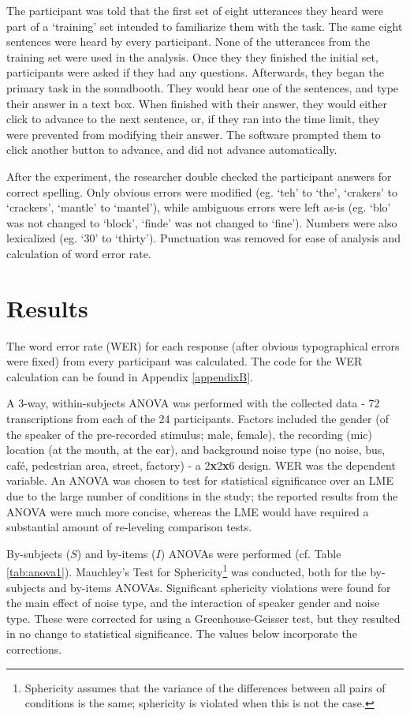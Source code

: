 The participant was told that the first set of eight utterances they heard were part of a `training' set intended to familiarize them with the task. The same eight sentences were heard by every participant.  None of the utterances from the training set were used in the analysis.  Once they they finished the initial set, participants were asked if they had any questions.  Afterwards, they began the primary task in the soundbooth.  They would hear one of the sentences, and type their answer in a text box.  When finished with their answer, they would either click to advance to the next sentence, or, if they ran into the time limit, they were prevented from modifying their answer.  The software prompted them to click another button to advance, and did not advance automatically.

After the experiment, the researcher double checked the participant answers for correct spelling.  Only obvious errors were modified (eg. `teh' to `the', `crakers' to `crackers', `mantle' to `mantel'), while ambiguous errors were left as-is (eg. `blo' was not changed to `block', `finde' was not changed to `fine').  Numbers were also lexicalized (eg. `30' to `thirty').  Punctuation was removed for ease of analysis and calculation of word error rate.


\section{Results}
\label{chap3:results}



The word error rate (WER) for each response (after obvious typographical errors were fixed) from every participant was calculated. The code for the WER calculation can be found in Appendix \ref{appendixB}.

A 3-way, within-subjects ANOVA was performed with the collected data - 72 transcriptions from each of the 24 participants. Factors included the gender (of the speaker of the pre-recorded stimulus; male, female), the recording (mic) location (at the mouth, at the ear), and background noise type (no noise, bus, caf\'{e}, pedestrian area, street, factory) - a 2\textbf{x}2\textbf{x}6 design.  WER was the dependent variable.  An ANOVA was chosen to test for statistical significance over an LME due to the large number of conditions in the study; the reported results from the ANOVA were much more concise, whereas the LME would have required a substantial amount of re-leveling comparison tests.  

By-subjects ($S$) and by-items ($I$) ANOVAs were performed (cf. Table \ref{tab:anova1}). Mauchley's Test for Sphericity\footnote{Sphericity assumes that the variance of the differences between all pairs of conditions is the same; sphericity is violated when this is not the case.} was conducted, both for the by-subjects and by-items ANOVAs.  Significant sphericity violations were found for the main effect of noise type, and the interaction of speaker gender and noise type.  These were corrected for using a Greenhouse-Geisser test, but they resulted in no change to statistical significance.  The values below incorporate the corrections.

